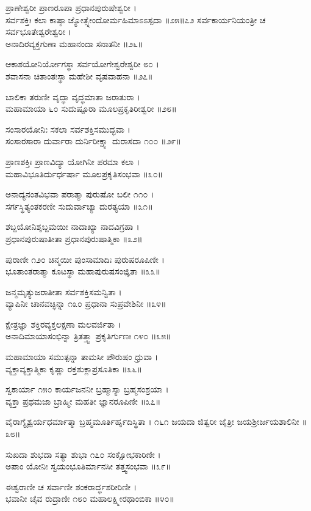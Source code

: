 ಪ್ರಾಣೇಶ್ವರೀ ಪ್ರಾಣರೂಪಾ ಪ್ರಧಾನಪುರುಷೇಶ್ವರೀ ।\\
ಸರ್ವಶಕ್ತಿಃ ಕಲಾ ಕಾಷ್ಠಾ ಜ್ಯೋತ್ಸ್ನೇಂದೋರ್ಮಹಿಮಾಽಽಸ್ಪದಾ ॥೨೫॥೭೨
ಸರ್ವಕಾರ್ಯನಿಯಂತ್ರೀ ಚ ಸರ್ವಭೂತೇಶ್ವರೇಶ್ವರೀ ।\\
ಅನಾದಿರವ್ಯಕ್ತಗುಣಾ ಮಹಾನಂದಾ ಸನಾತನೀ ॥೨೬॥

ಆಕಾಶಯೋನಿರ್ಯೋಗಸ್ಥಾ ಸರ್ವಯೋಗೇಶ್ವರೇಶ್ವರೀ ೮೦ ।\\
ಶವಾಸನಾ ಚಿತಾಂತಃಸ್ಥಾ ಮಹೇಶೀ ವೃಷವಾಹನಾ ॥೨೭॥

ಬಾಲಿಕಾ ತರುಣೀ ವೃದ್ಧಾ ವೃದ್ಧಮಾತಾ ಜರಾತುರಾ ।\\
ಮಹಾಮಾಯಾ ೬೦ ಸುದುಷ್ಪೂರಾ ಮೂಲಪ್ರಕೃತಿರೀಶ್ವರೀ ॥೨೮॥

ಸಂಸಾರಯೋನಿಃ ಸಕಲಾ ಸರ್ವಶಕ್ತಿಸಮುದ್ಭವಾ ।\\
ಸಂಸಾರಸಾರಾ ದುರ್ವಾರಾ ದುರ್ನಿರೀಕ್ಷ್ಯಾ ದುರಾಸದಾ ೧೦೦ ॥೨೯॥

ಪ್ರಾಣಶಕ್ತಿಃ ಪ್ರಾಣವಿದ್ಯಾ ಯೋಗಿನೀ ಪರಮಾ ಕಲಾ ।\\
ಮಹಾವಿಭೂತಿರ್ದುರ್ಧರ್ಷಾ ಮೂಲಪ್ರಕೃತಿಸಂಭವಾ ॥೩೦॥

ಅನಾದ್ಯನಂತವಿಭವಾ ಪರಾತ್ಮಾ ಪುರುಷೋ ಬಲೀ ೧೧೦ ।\\
ಸರ್ಗಸ್ಥಿತ್ಯಂತಕರಣೀ ಸುದುರ್ವಾಚ್ಯಾ ದುರತ್ಯಯಾ ॥೩೧॥

ಶಬ್ದಯೋನಿಶ್ಶಬ್ದಮಯೀ ನಾದಾಖ್ಯಾ ನಾದವಿಗ್ರಹಾ ।\\
ಪ್ರಧಾನಪುರುಷಾತೀತಾ ಪ್ರಧಾನಪುರುಷಾತ್ಮಿಕಾ ॥೩೨॥

ಪುರಾಣೀ ೧೨೦ ಚಿನ್ಮಯೀ ಪುಂಸಾಮಾದಿಃ ಪುರುಷರೂಪಿಣೀ ।\\
ಭೂತಾಂತರಾತ್ಮಾ ಕೂಟಸ್ಥಾ ಮಹಾಪುರುಷಸಂಜ್ಞಿತಾ ॥೩೩॥

ಜನ್ಮಮೃತ್ಯುಜರಾತೀತಾ ಸರ್ವಶಕ್ತಿಸಮನ್ವಿತಾ ।\\
ವ್ಯಾಪಿನೀ ಚಾನವಚ್ಛಿನ್ನಾ ೧೩೦ ಪ್ರಧಾನಾ ಸುಪ್ರವೇಶಿನೀ ॥೩೪॥

ಕ್ಷೇತ್ರಜ್ಞಾ ಶಕ್ತಿರವ್ಯಕ್ತಲಕ್ಷಣಾ ಮಲವರ್ಜಿತಾ ।\\
ಅನಾದಿಮಾಯಾಸಂಭಿನ್ನಾ ತ್ರಿತತ್ತ್ವಾ ಪ್ರಕೃತಿರ್ಗುಣಃ ೧೪೦ ॥೩೫॥

ಮಹಾಮಾಯಾ ಸಮುತ್ಪನ್ನಾ ತಾಮಸೀ ಪೌರುಷಂ ಧ್ರುವಾ ।\\
ವ್ಯಕ್ತಾವ್ಯಕ್ತಾತ್ಮಿಕಾ ಕೃಷ್ಣಾ ರಕ್ತಶುಕ್ಲಾಪ್ರಸೂತಿಕಾ ॥೩೬॥

ಸ್ವಕಾರ್ಯಾ ೧೫೦ ಕಾರ್ಯಜನನೀ ಬ್ರಹ್ಮಾಸ್ಯಾ ಬ್ರಹ್ಮಸಂಶ್ರಯಾ ।\\
ವ್ಯಕ್ತಾ ಪ್ರಥಮಜಾ ಬ್ರಾಹ್ಮೀ ಮಹತೀ ಜ್ಞಾನರೂಪಿಣೀ ॥೩೭॥

ವೈರಾಗ್ಯೈಶ್ವರ್ಯಧರ್ಮಾತ್ಮಾ ಬ್ರಹ್ಮಮೂರ್ತಿರ್ಹೃದಿಸ್ಥಿತಾ । ೧೬೧
ಜಯದಾ ಜಿತ್ವರೀ ಜೈತ್ರೀ ಜಯಶ್ರೀರ್ಜಯಶಾಲಿನೀ ॥೩೮॥

ಸುಖದಾ ಶುಭದಾ ಸತ್ಯಾ ಶುಭಾ ೧೭೦ ಸಂಕ್ಷೋಭಕಾರಿಣೀ ।\\
ಅಪಾಂ ಯೋನಿಃ ಸ್ವಯಂಭೂತಿರ್ಮಾನಸೀ ತತ್ತ್ವಸಂಭವಾ ॥೩೯॥

ಈಶ್ವರಾಣೀ ಚ ಸರ್ವಾಣೀ ಶಂಕರಾರ್ದ್ಧಶರೀರಿಣೀ ।\\
ಭವಾನೀ ಚೈವ ರುದ್ರಾಣೀ ೧೮೦ ಮಹಾಲಕ್ಷ್ಮೀರಥಾಂಬಿಕಾ ॥೪೦॥

